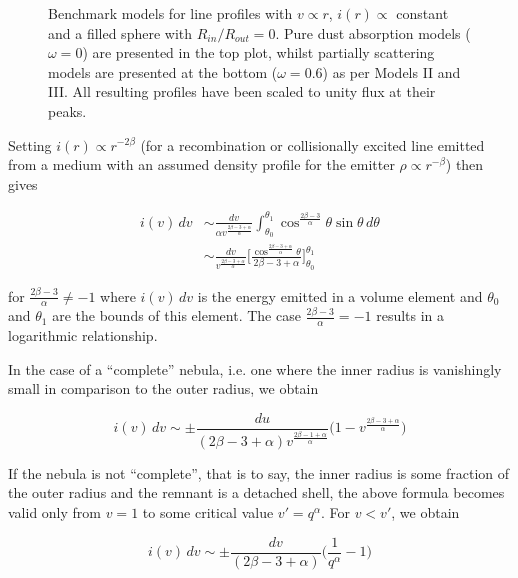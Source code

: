 \begin{figure}
\begin{subfigure}{\textwidth}
\end{subfigure}  
\caption{Benchmark models for line profiles  with $v \propto r$, $i(r) \propto$ constant and a filled sphere with $R_{in}/R_{out}=0$.  Pure dust absorption models ($\omega = 0$) are presented in the top plot, whilst partially scattering models are presented at the bottom ($\omega = 0.6$) as per \citet{Lucy1989} Models II and III. All resulting profiles have been scaled to unity flux at their peaks.}
\label{fig:Lucy}
\end{figure}

Setting $i(r) \propto r^{-2\beta}$ (for a recombination or collisionally excited line emitted from 
a medium with an assumed density profile for the emitter $\rho \propto 
r^{-\beta}$) then gives

\begin{equation}
\begin{split}
i(v) \, dv &\sim \frac{dv}{\alpha v^{\frac{2\beta-3+\alpha}{\alpha}}} \int^{\theta_1}_{\theta_0} \cos^{\frac{2\beta-3}{\alpha}} \theta \sin \theta \, d\theta 
\\
&\sim  \frac{dv}{v^{\frac{2\beta-3+\alpha}{\alpha}}} \Bigg[\frac{\cos^{\frac{2\beta - 3 + \alpha}{\alpha}} \theta}{2\beta -3 + \alpha}\Bigg]^{\theta_1}_{\theta_0}
\end{split}
\end{equation}

\noindent for $\frac{2\beta-3}{\alpha} \neq -1$ where $i(v) \,dv$ is the energy emitted in a volume element and $\theta_0$ and $\theta_1$ are the bounds of this element.  The case 
$\frac{2\beta-3}{\alpha} = -1$ results in a logarithmic relationship.



In the case of a ``complete'' nebula, i.e. one where the inner radius is 
vanishingly small in comparison to the outer radius, we obtain

\begin{equation}
\label{eqn:sides}
	i(v) \, dv \sim \pm \frac{du}{(2\beta-3+\alpha) v^{\frac{2\beta-1+\alpha}{\alpha}}} \Big(1-v^{\frac{2\beta-3+\alpha}{\alpha}} \Big)
\end{equation}

If the nebula is not ``complete'', that is to say, the inner radius is some fraction of the outer radius and the remnant is a detached shell, the above formula becomes valid only from $v=1$ to some critical value $v'=q^\alpha$. For $v<v'$, we obtain

\begin{equation}
i(v) \, dv \sim \pm \frac{dv}{(2\beta-3+\alpha)} \Big( \frac{1}{q^\alpha} - 1 \Big)
\end{equation}

